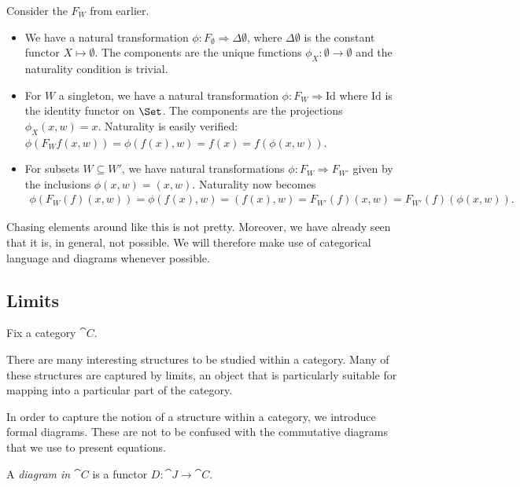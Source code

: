 \documentclass{article}
\begin{document}
\begin{example}
  Consider the $F_W$ from earlier.
  \begin{itemize}
    \item We have a natural transformation $\phi:F_\emptyset \Rightarrow
      \Delta\emptyset$, where $\Delta\emptyset$ is the constant functor
      $X\mapsto\emptyset$. The components are the unique functions
      $\phi_X:\emptyset\to\emptyset$ and the naturality condition is trivial.
    \item For $W$ a singleton, we have a natural transformation $\phi:F_W\Rightarrow
      \text{Id}$ where $\text{Id}$ is the identity functor on $\Set$. The
      components are the projections $\phi_X(x,w)=x$. Naturality is easily
      verified: $\phi(F_W f(x,w))=\phi(f(x),w) = f(x) = f(\phi(x,w))$.
    \item For subsets $W\subseteq W'$, we have natural transformations
      $\phi:F_W\Rightarrow F_{W'}$ given by the inclusions $\phi(x,w) = (x,w)$.
      Naturality now becomes
      \begin{align*}
        \phi(F_W(f)(x,w)) = \phi(f(x),w) = (f(x),w) = F_{W'}(f)(x,w) =
        F_{W'}(f)(\phi(x,w)).
      \end{align*}
  \end{itemize}
\end{example}

Chasing elements around like this is not pretty. Moreover, we have already
seen that it is, in general, not possible. We will therefore make use of
categorical language and diagrams whenever possible.

\subsection{Limits}

Fix a category $\cat{C}$.

There are many interesting structures to be studied within a category. Many of these
structures are captured by limits, an object that is particularly suitable
for mapping into a particular part of the category.

In order to capture the notion of a structure within a category, we introduce
formal diagrams. These are not to be confused with the commutative diagrams that
we use to present equations.

\begin{definition}
  A \emph{diagram in $\cat{C}$} is a functor $D:\cat{J}\to\cat{C}$.
\end{definition}
\end{document}
